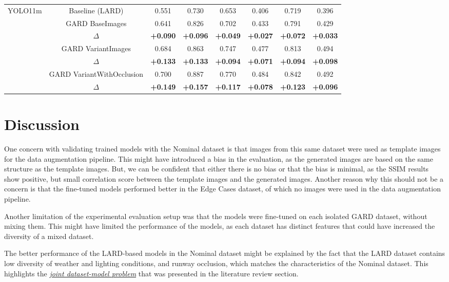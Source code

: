 \begin{table}[htbp]
\begin{tabular}{|c|c|ccc|ccc|}
\hline
\multirow{6}{*}{YOLO11m}
& Baseline (LARD) & 0.551 & 0.730 & 0.653 & 0.406 & 0.719 & 0.396 \\
& GARD BaseImages & 0.641 & 0.826 & 0.702 & 0.433 & 0.791 & 0.429 \\
& $\Delta$ & \textbf{+0.090} & \textbf{+0.096} & \textbf{+0.049} & \textbf{+0.027} & \textbf{+0.072} & \textbf{+0.033} \\
& GARD VariantImages & 0.684 & 0.863 & 0.747 & 0.477 & 0.813 & 0.494 \\
& $\Delta$ & \textbf{+0.133} & \textbf{+0.133} & \textbf{+0.094} & \textbf{+0.071} & \textbf{+0.094} & \textbf{+0.098} \\
& GARD VariantWithOcclusion & 0.700 & 0.887 & 0.770 & 0.484 & 0.842 & 0.492 \\
& $\Delta$ & \textbf{+0.149} & \textbf{+0.157} & \textbf{+0.117} & \textbf{+0.078} & \textbf{+0.123} & \textbf{+0.096} \\
\hline

\end{tabular}
\end{table}

\FloatBarrier
\section{Discussion}

One concern with validating trained models with the Nominal dataset is that
images from this same dataset were used as template images for the data
augmentation pipeline. This might have introduced a bias in the evaluation, as
the generated images are based on the same structure as the template images.
But, we can be confident that either there is no bias or that the bias is
minimal, as the SSIM results show positive, but small correlation score between
the template images and the generated images. Another reason why this should not
be a concern is that the fine-tuned models performed better in the Edge Cases dataset, of which no images were used in the data augmentation pipeline.

Another limitation of the experimental evaluation setup was that the models were
fine-tuned on each isolated GARD dataset, without mixing them. This might have
limited the performance of the models, as each dataset has distinct features
that could have increased the diversity of a mixed dataset.

The better performance of the LARD-based models in the Nominal dataset might be
explained by the fact that the LARD dataset contains low diversity of weather
and lighting conditions, and runway occlusion, which matches the characteristics
of the Nominal dataset. This highlights the
\hyperref[sec:joint_hypothesis]{\emph{joint dataset-model problem}} that
was presented in the literature review section.

